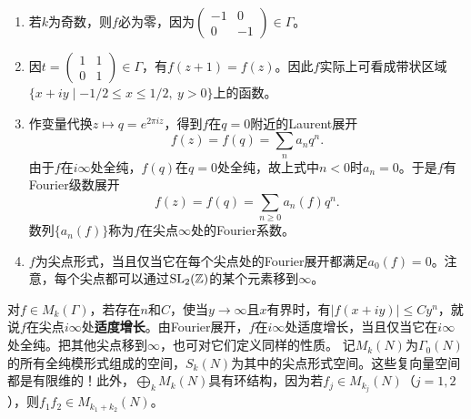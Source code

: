 \begin{note}[L6S1O2]
\begin{enumerate}
\item 若$k$为奇数，则$f$必为零，因为$\begin{pmatrix}-1&0\\0&-1\end{pmatrix}\in\Gamma$。
\item 因$t=\begin{pmatrix}1&1\\0&1\end{pmatrix}\in\Gamma$，有$f(z+1)=f(z)$。因此$f$实际上可看成带状区域$\{x+iy\mid-1/2\leq x\leq1/2,\ y>0\}$上的函数。
\item 作变量代换$z\mapsto q=e^{2\pi iz}$，得到$f$在$q=0$附近的Laurent展开
\[f(z)=f(q)=\sum_n a_nq^n.\]
由于$f$在$i\infty$处全纯，$f(q)$在$q=0$处全纯，故上式中$n<0$时$a_n=0$。于是$f$有Fourier级数展开
\[f(z)=f(q)=\sum_{n\geq0}a_n(f)q^n.\]
数列$\{a_n(f)\}$称为$f$在尖点$\infty$处的Fourier系数。
\item $f$为尖点形式，当且仅当它在每个尖点处的Fourier展开都满足$a_0(f)=0$。注意，每个尖点都可以通过$\operatorname{SL}_2(\mathbb{Z})$的某个元素移到$\infty$。
\end{enumerate}
\end{note}
对$f\in M_k(\Gamma)$，若存在$n$和$C$，使当$y\to\infty$且$x$有界时，有$|f(x+iy)|\leq Cy^n$，就说$f$在尖点$i\infty$处\textbf{适度增长}。由Fourier展开，$f$在$i\infty$处适度增长，当且仅当它在$i\infty$处全纯。把其他尖点移到$\infty$，也可对它们定义同样的性质。
记$M_k(N)$为$\Gamma_0(N)$的所有全纯模形式组成的空间，$S_k(N)$为其中的尖点形式空间。这些复向量空间都是有限维的！此外，$\bigoplus_kM_k(N)$具有环结构，因为若$f_j\in M_{k_j}(N)$（$j=1,2$），则$f_1f_2\in M_{k_1+k_2}(N)$。
